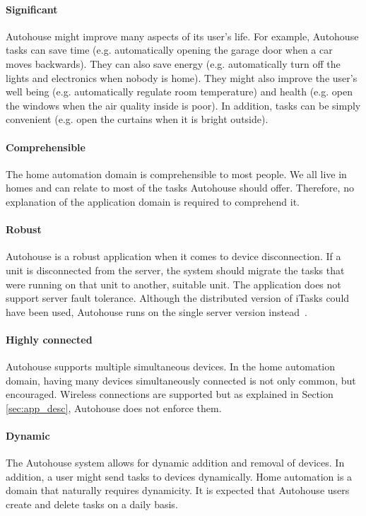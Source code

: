 \paragraph{Significant} Autohouse might improve many aspects of its user's life. For example, Autohouse tasks can save time (e.g. automatically opening the garage door when a car moves backwards). They can also save energy (e.g. automatically turn off the lights and electronics when nobody is home). They might also improve the user's well being (e.g. automatically regulate room temperature) and health (e.g. open the windows when the air quality inside is poor). In addition, tasks can be simply convenient (e.g. open the curtains when it is bright outside).

\paragraph{Comprehensible} The home automation domain is comprehensible to most people. We all live in homes and can relate to most of the tasks Autohouse should offer. Therefore, no explanation of the application domain is required to comprehend it. 

\paragraph{Robust} Autohouse is a robust application when it comes to device disconnection. If a unit is disconnected from the server, the system should migrate the tasks that were running on that unit to another, suitable unit. The application does not support server fault tolerance. Although the distributed version of iTasks could have been used, Autohouse runs on the single server version instead~\cite{distributed}.

\paragraph{Highly connected} Autohouse supports multiple simultaneous devices. In the home automation domain, having many devices simultaneously connected is not only common, but encouraged. Wireless connections are supported but as explained in Section \ref{sec:app_desc}, Autohouse does not enforce them. 

\paragraph{Dynamic} The Autohouse system allows for dynamic addition and removal of devices. In addition, a user might send tasks to devices dynamically. Home automation is a domain that naturally requires dynamicity. It is expected that Autohouse users create and delete tasks on a daily basis.

